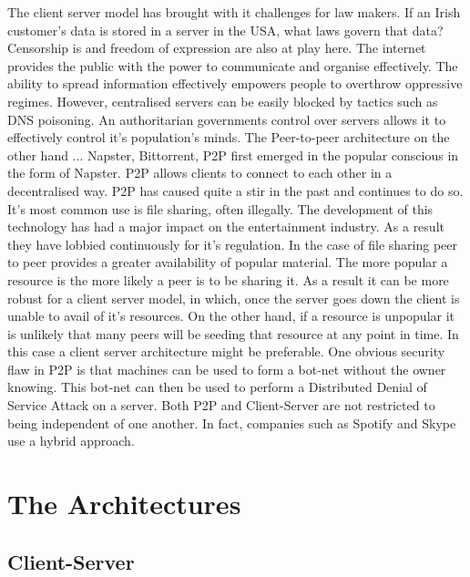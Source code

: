 \documentclass[12pt]{amsart}
\begin{document}
The client server model has brought with it challenges for law makers. If an Irish customer's data is stored in a server in the USA, what laws govern that data?
Censorship is and freedom of expression are also at play here. The internet provides the public with the power to communicate and organise effectively. The ability to spread information effectively empowers people to overthrow oppressive regimes. However, centralised servers can be easily blocked by tactics such as DNS poisoning. An authoritarian governments control over servers allows it to effectively control it's population's minds.
The Peer-to-peer architecture on the other hand ... Napster, Bittorrent, 
P2P first emerged in the popular conscious in the form of Napster. P2P allows clients to connect to each other in a decentralised way.
P2P has caused quite a stir in the past and continues to do so. It's most common use is file sharing, often illegally. The development of this technology has had a major impact on the entertainment industry. As a result they have lobbied continuously for it's regulation. 
In the case of file sharing peer to peer provides a greater availability of popular material. The more popular a resource is the more likely a peer is to be sharing it. As a result it can be more robust for a client server model, in which, once the server goes down the client is unable to avail of it's resources. On the other hand, if a resource is unpopular it is unlikely that many peers will be seeding that resource at any point in time. In this case a client server architecture might be preferable.
One obvious security flaw in P2P is that machines can be used to form a bot-net without the owner knowing. This bot-net can then be used to perform a Distributed Denial of Service Attack on a server.
Both P2P and Client-Server are not restricted to being independent of one another. In fact, companies such as Spotify and Skype use a hybrid approach.



\section{The Architectures}
\subsection{Client-Server}
\end{document}
